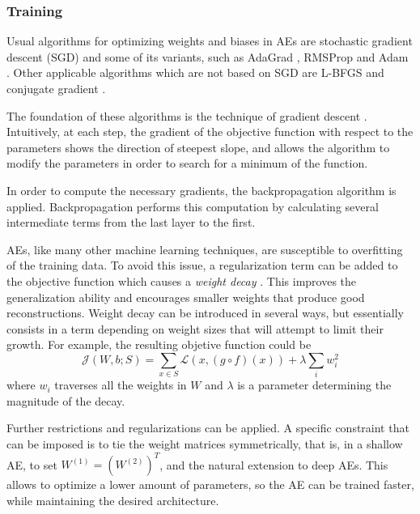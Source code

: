 \subsubsection{Training}\label{p1Sec.Training}

Usual algorithms for optimizing weights and biases in AEs are stochastic gradient descent (SGD)  and some of its variants, such as AdaGrad , RMSProp  and Adam . Other applicable algorithms which are not based on SGD are L-BFGS and conjugate gradient .

The foundation of these algorithms is the technique of gradient descent . Intuitively, at each step, the gradient of the objective function with respect to the parameters shows the direction of steepest slope, and allows the algorithm to modify the parameters in order to search for a minimum of the function. 

In order to compute the necessary gradients, the backpropagation algorithm  is applied. Backpropagation performs this computation by calculating several intermediate terms from the last layer to the first.

AEs, like many other machine learning techniques, are susceptible to overfitting of the training data. To avoid this issue, a regularization term can be added to the objective function which causes a \textit{weight decay} . This improves the generalization ability and encourages smaller weights that produce good reconstructions. Weight decay can be introduced in several ways, but essentially consists in a term depending on weight sizes that will attempt to limit their growth. For example, the resulting objetive function could be
\begin{equation}
  \label{p1Eq.wd}
  \mathcal J(W,b;S)=\sum_{x\in S}\mathcal L(x, (g\circ f)(x)) + \lambda \sum_{i}w_i^2
\end{equation}
where $w_i$ traverses all the weights in $W$ and $\lambda$ is a parameter determining the magnitude of the decay.

Further restrictions and regularizations can be applied. A specific constraint that can be imposed is to tie the weight matrices symmetrically, that is, in a shallow AE, to set $W^{(1)}=(W^{(2)})^T$, and the natural extension to deep AEs. This allows to optimize a lower amount of parameters, so the AE can be trained faster, while maintaining the desired architecture.

